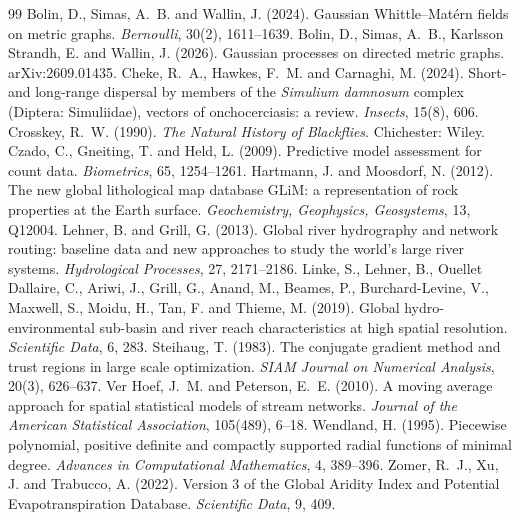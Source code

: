 \documentclass[11pt,a4paper]{article}
\begin{document}
\begin{thebibliography}{99}
 Bolin, D., Simas, A.~B. and Wallin, J. (2024). Gaussian Whittle--Mat\'ern fields on metric graphs. \textit{Bernoulli}, 30(2), 1611--1639.
 Bolin, D., Simas, A.~B., Karlsson Strandh, E. and Wallin, J. (2026). Gaussian processes on directed metric graphs. arXiv:2609.01435.
 Cheke, R.~A., Hawkes, F.~M. and Carnaghi, M. (2024). Short- and long-range dispersal by members of the \textit{Simulium damnosum} complex (Diptera: Simuliidae), vectors of onchocerciasis: a review. \textit{Insects}, 15(8), 606.
 Crosskey, R.~W. (1990). \textit{The Natural History of Blackflies}. Chichester: Wiley.
 Czado, C., Gneiting, T. and Held, L. (2009). Predictive model assessment for count data. \textit{Biometrics}, 65, 1254--1261.
 Hartmann, J. and Moosdorf, N. (2012). The new global lithological map database GLiM: a representation of rock properties at the Earth surface. \textit{Geochemistry, Geophysics, Geosystems}, 13, Q12004.
 Lehner, B. and Grill, G. (2013). Global river hydrography and network routing: baseline data and new approaches to study the world's large river systems. \textit{Hydrological Processes}, 27, 2171--2186.
 Linke, S., Lehner, B., Ouellet Dallaire, C., Ariwi, J., Grill, G., Anand, M., Beames, P., Burchard-Levine, V., Maxwell, S., Moidu, H., Tan, F. and Thieme, M. (2019). Global hydro-environmental sub-basin and river reach characteristics at high spatial resolution. \textit{Scientific Data}, 6, 283.
 Steihaug, T. (1983). The conjugate gradient method and trust regions in large scale optimization. \textit{SIAM Journal on Numerical Analysis}, 20(3), 626--637.
 Ver Hoef, J.~M. and Peterson, E.~E. (2010). A moving average approach for spatial statistical models of stream networks. \textit{Journal of the American Statistical Association}, 105(489), 6--18.
 Wendland, H. (1995). Piecewise polynomial, positive definite and compactly supported radial functions of minimal degree. \textit{Advances in Computational Mathematics}, 4, 389--396.
 Zomer, R.~J., Xu, J. and Trabucco, A. (2022). Version 3 of the Global Aridity Index and Potential Evapotranspiration Database. \textit{Scientific Data}, 9, 409.
\end{thebibliography}
\end{document}

